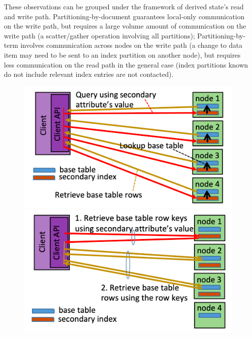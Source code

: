 \bigskip

These observations can be grouped under the framework of derived state's read and write path.
Partitioning-by-document guarantees local-only communication on the write path, but requires a large volume amount of
communication on the write path (a scatter/gather operation involving all partitions);
Partitioning-by-term involves communication across nodes on the write path (a change to data item may need to be sent to
an index partition on another node),
but requires less communication on the read path in the general case
(index partitions known do not include relevant index entries are not contacted).

\begin{figure}
    \centering
    \begin{minipage}{.5\textwidth}
        \centering
        \includegraphics[scale=0.3]{figures/design_space/communication_pattern_document_partitioned.png}
        \caption{}
        \label{fig:prob1_6_2}
    \end{minipage}%
    \begin{minipage}{0.5\textwidth}
        \centering
        \includegraphics[scale=0.3]{figures/design_space/communication_pattern_term_partitioned.png}
        \caption{}
        \label{fig:prob1_6_1}
    \end{minipage}
\end{figure}

